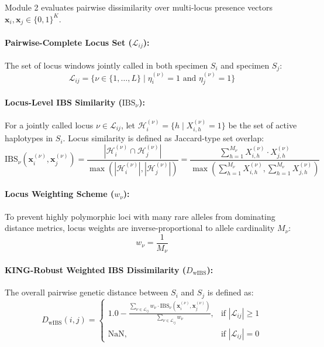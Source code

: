 \documentclass[11pt,a4paper]{article}
\begin{document}
Module 2 evaluates pairwise dissimilarity over multi-locus presence vectors $\mathbf{x}_i, \mathbf{x}_j \in \{0, 1\}^K$.

\paragraph{Pairwise-Complete Locus Set ($\mathcal{L}_{ij}$):} The set of locus windows jointly called in both specimen $S_i$ and specimen $S_j$:
\begin{equation}
\mathcal{L}_{ij} = \{\nu \in \{1, \dots, L\} \mid \eta_{i}^{(\nu)} = 1 \text{ and } \eta_{j}^{(\nu)} = 1\}
\end{equation}

\paragraph{Locus-Level IBS Similarity ($\text{IBS}_\nu$):} For a jointly called locus $\nu \in \mathcal{L}_{ij}$, let $\mathcal{H}_i^{(\nu)} = \{h \mid X_{i, h}^{(\nu)} = 1\}$ be the set of active haplotypes in $S_i$. Locus similarity is defined as Jaccard-type set overlap:
\begin{equation}
\text{IBS}_\nu(\mathbf{x}_i^{(\nu)}, \mathbf{x}_j^{(\nu)}) = \frac{|\mathcal{H}_i^{(\nu)} \cap \mathcal{H}_j^{(\nu)}|}{\max(|\mathcal{H}_i^{(\nu)}|, |\mathcal{H}_j^{(\nu)}|)} = \frac{\sum_{h=1}^{M_\nu} X_{i,h}^{(\nu)} \cdot X_{j,h}^{(\nu)}}{\max \left( \sum_{h=1}^{M_\nu} X_{i,h}^{(\nu)}, \sum_{h=1}^{M_\nu} X_{j,h}^{(\nu)} \right)}
\end{equation}

\paragraph{Locus Weighting Scheme ($w_\nu$):} To prevent highly polymorphic loci with many rare alleles from dominating distance metrics, locus weights are inverse-proportional to allele cardinality $M_\nu$:
\begin{equation}
w_\nu = \frac{1}{M_\nu}
\end{equation}

\paragraph{KING-Robust Weighted IBS Dissimilarity ($D_{\text{wIBS}}$):} The overall pairwise genetic distance between $S_i$ and $S_j$ is defined as:
\begin{equation}
D_{\text{wIBS}}(i, j) = 
\begin{cases}
1.0 - \frac{\sum_{\nu \in \mathcal{L}_{ij}} w_\nu \cdot \text{IBS}_\nu(\mathbf{x}_i^{(\nu)}, \mathbf{x}_j^{(\nu)})}{\sum_{\nu \in \mathcal{L}_{ij}} w_\nu}, & \text{if } |\mathcal{L}_{ij}| \ge 1 \\
\text{NaN}, & \text{if } |\mathcal{L}_{ij}| = 0
\end{cases}
\end{equation}
\end{document}

